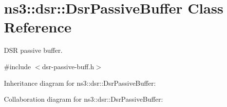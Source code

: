\hypertarget{classns3_1_1dsr_1_1DsrPassiveBuffer}{}\section{ns3\+:\+:dsr\+:\+:Dsr\+Passive\+Buffer Class Reference}
\label{classns3_1_1dsr_1_1DsrPassiveBuffer}


D\+SR passive buffer.  




{\ttfamily \#include $<$dsr-\/passive-\/buff.\+h$>$}



Inheritance diagram for ns3\+:\+:dsr\+:\+:Dsr\+Passive\+Buffer\+:


Collaboration diagram for ns3\+:\+:dsr\+:\+:Dsr\+Passive\+Buffer\+:
